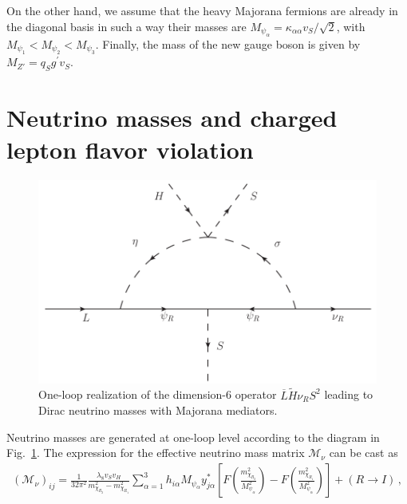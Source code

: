 \documentclass[12pt]{article}
\begin{document}
On the other hand, we assume that the heavy Majorana fermions are already in the diagonal basis in such a way their masses are $M_{\psi_\alpha}=\kappa_{\alpha\alpha}v_S/\sqrt{2}$, with $M_{\psi_1}<M_{\psi_2}<M_{\psi_3}$. Finally, the mass of the new gauge boson is given by $M_{Z'}=q_Sg^{\prime} v_S$.

\section{Neutrino masses and charged lepton flavor violation}
\label{sec:Neutrinos}
%
\begin{figure}
\centering
\includegraphics[scale=0.6]{Neutrino_Loop.pdf}
\caption{One-loop realization of the dimension-6 operator $\overline{L} \tilde{H} \nu_R S^2$ leading to Dirac neutrino masses with Majorana mediators.}
\label{fig:zee}
\end{figure}
%
Neutrino masses are generated at one-loop level according to the diagram in  Fig.~\ref{fig:zee}. The expression for the effective neutrino mass matrix $\mathcal{M}_{\nu}$ can be cast as
%
\begin{align}
(\mathcal{M}_{\nu})_{ij} = \frac{1}{32 \pi^{2}}  \frac{\lambda_8 v_S v_H} {m_{\chi_{R_2}}^{2}-m_{\chi_{R_1}}^{2}}\sum_{\alpha=1}^{3} h_{i \alpha} M_{\psi_\alpha} y^{*}_{j\alpha}\left[ F\left( \frac{m_{\chi_{R_2}}^{2}}{M_{\psi_{\alpha}}^{2}} \right) - F\left( \frac{m_{\chi_{R_1}}^{2}}{M_{\psi_{\alpha}}^{2}} \right) \right] + (R \to I)\,,
\end{align}
\end{document}
